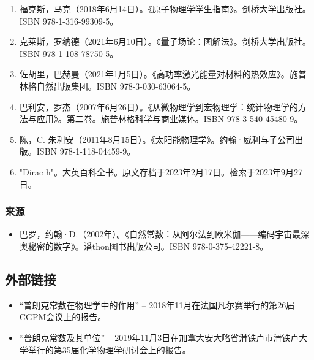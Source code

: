 \begin{enumerate}
\item 福克斯，马克（2018年6月14日）。《原子物理学学生指南》。剑桥大学出版社。ISBN 978-1-316-99309-5。  
\item 克莱斯，罗纳德（2021年6月10日）。《量子场论：图解法》。剑桥大学出版社。ISBN 978-1-108-78750-5。
\item 佐胡里，巴赫曼（2021年1月5日）。《高功率激光能量对材料的热效应》。施普林格自然出版集团。ISBN 978-3-030-63064-5。  
\item 巴利安，罗杰（2007年6月26日）。《从微物理学到宏物理学：统计物理学的方法与应用》。第二卷。施普林格科学与商业媒体。ISBN 978-3-540-45480-9。  
\item 陈，C. 朱利安（2011年8月15日）。《太阳能物理学》。约翰·威利与子公司出版。ISBN 978-1-118-04459-9。  
\item "Dirac h"。大英百科全书。原文存档于2023年2月17日。检索于2023年9月27日。

\end{enumerate}
\subsubsection{来源}  
\begin{itemize}
\item 巴罗，约翰·D.（2002年）。《自然常数：从阿尔法到欧米伽——编码宇宙最深奥秘密的数字》。潘thon图书出版公司。ISBN 978-0-375-42221-8。
\end{itemize}
\subsection{外部链接}  
\begin{itemize}
\item “普朗克常数在物理学中的作用” – 2018年11月在法国凡尔赛举行的第26届CGPM会议上的报告。  
\item “普朗克常数及其单位” – 2019年11月3日在加拿大安大略省滑铁卢市滑铁卢大学举行的第35届化学物理学研讨会上的报告。
\end{itemize}